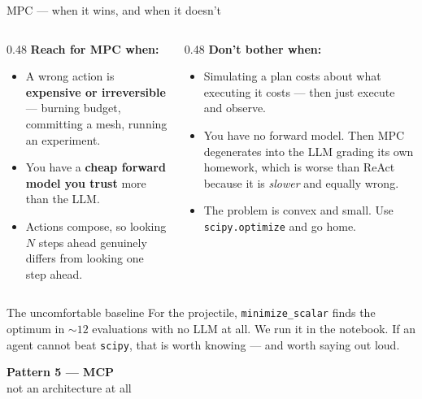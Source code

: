 \documentclass[aspectratio=169,10pt]{beamer}
\newcommand{\code}[1]{\texttt{\small #1}}
\newcommand{\hl}[1]{\textcolor{accent}{\textbf{#1}}}
\begin{document}
\begin{frame}{MPC --- when it wins, and when it doesn't}
\begin{columns}[T,onlytextwidth]
\begin{column}{0.48\textwidth}
\textbf{Reach for MPC when:}
\begin{itemize}\itemsep4pt\small
  \item A wrong action is \hl{expensive or irreversible} --- burning budget,
        committing a mesh, running an experiment.
  \item You have a \hl{cheap forward model you trust} more than the LLM.
  \item Actions compose, so looking $N$ steps ahead genuinely differs from
        looking one step ahead.
\end{itemize}
\end{column}
\begin{column}{0.48\textwidth}
\textbf{Don't bother when:}
\begin{itemize}\itemsep4pt\small
  \item Simulating a plan costs about what executing it costs --- then just
        execute and observe.
  \item You have no forward model. Then MPC degenerates into the LLM grading
        its own homework, which is worse than ReAct because it is
        \emph{slower} and equally wrong.
  \item The problem is convex and small. Use \code{scipy.optimize} and go home.
\end{itemize}
\end{column}
\end{columns}

\vfill
\begin{block}{The uncomfortable baseline}
For the projectile, \code{minimize\_scalar} finds the optimum in ${\sim}12$
evaluations with no LLM at all. We run it in the notebook. If an agent cannot
beat \code{scipy}, that is worth knowing --- and worth saying out loud.
\end{block}
\end{frame}

\begin{frame}[plain]
\begin{center}
{\Large\bfseries Pattern 5 --- MCP}\\[0.5em]
{\large\color{gray} not an architecture at all}
\end{center}
\end{frame}
\end{document}
